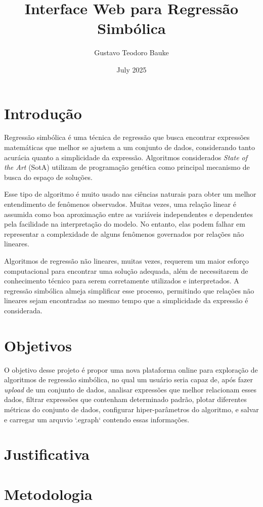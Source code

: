 \documentclass{article}
\title{Interface Web para Regressão Simbólica}
\author{Gustavo Teodoro Bauke}
\date{July 2025}
\begin{document}
\maketitle

\section{Introdução}

Regressão simbólica é uma técnica de regressão que busca encontrar expressões matemáticas que melhor
se ajustem a um conjunto de dados, considerando tanto acurácia quanto a simplicidade da expressão.
Algoritmos considerados \textit{State of the Art} (SotA) utilizam de programação genética como principal mecanismo
de busca do espaço de soluções.
\par Esse tipo de algoritmo é muito usado nas ciências naturais para obter um melhor entendimento de fenômenos
observados. Muitas vezes, uma relação linear é assumida como boa aproximação entre as variáveis independentes e dependentes pela facilidade
na interpretação do modelo. No entanto, elas podem falhar em representar a complexidade de alguns fenômenos governados por
relações não lineares.
\par Algoritmos de regressão não lineares, muitas vezes, requerem um maior esforço computacional para encontrar uma solução
adequada, além de necessitarem de conhecimento técnico para serem corretamente utilizados e interpretados. A regressão simbólica
almeja simplificar esse processo, permitindo que relações não lineares sejam encontradas ao mesmo tempo que a simplicidade da expressão é considerada.

\section{Objetivos}

O objetivo desse projeto é propor uma nova plataforma online para exploração de algoritmos de regressão simbólica, no qual um usuário seria capaz de, após fazer \textit{upload} de um conjunto de dados,
analisar expressões que melhor relacionam esses dados, filtrar expressões que contenham determinado padrão, plotar diferentes métricas do conjunto de dados, configurar hiper-parâmetros do algoritmo, e salvar
e carregar um arquvio `.egraph` contendo essas informações.

\section{Justificativa}

\section{Metodologia}
\end{document}
